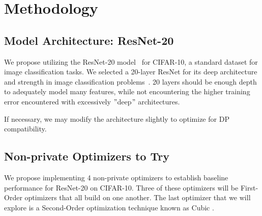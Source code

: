 \documentclass{article}
\begin{document}
    \section{Methodology}\label{sec:methodology}

    \subsection{Model Architecture: ResNet-20}\label{subsec:model-architecture:-resnet-20}


    We propose utilizing the ResNet-20 model~\cite{Idelbayev_ResNet20} for CIFAR-10,
    a standard dataset for image classification tasks.
    We selected a 20-layer ResNet for its deep architecture and strength in image classification problems~\cite{DBLP:journals/corr/HeZRS15}.
    20
    layers should be enough depth to adequately model many features, while not encountering the higher training error encountered
    with excessively \("\)deep\("\) architectures. \cite{DBLP:journals/corr/HeZRS15}

    If necessary, we may modify the architecture slightly to optimize for DP compatibility.

    \subsection{Non-private Optimizers to Try}\label{subsec:non-private-optimizers-to-try}
    We propose implementing 4 non-private optimizers to establish baseline performance for ResNet-20 on CIFAR-10.
    Three of these optimizers will be First-Order optimizers
    that all build on one another.
    The last optimizer that we will explore is a Second-Order optimization technique known as Cubic .
\end{document}
